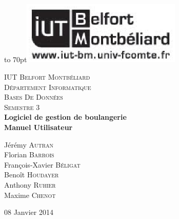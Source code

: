 \documentclass[12pt]{report}
\begin{document}
{
    \begin{titlepage}

    \vbox to 70pt{\hfill\includegraphics[height=3cm]{images/logo-iut.eps}}\
    \begin{center}

    \textsc{\LARGE IUT Belfort Montbéliard}\\[0.7cm]
    \textsc{\LARGE Département Informatique}\\[1.0cm]
    \textsc{\Large Bases De Données}\\[0.5cm]
    \textsc{\Large Semestre 3}\\[5cm]


    {\huge \bfseries Logiciel de gestion de boulangerie}\\[0.5cm]
    {\huge \bfseries Manuel Utilisateur}\\[5cm]

    \begin{large}
    Jérémy \textsc{Autran}\\[0.3em]
    Florian \textsc{Barrois}\\[0.3em]
    François-Xavier \textsc{Béligat}\\[0.3em]
    Benoît \textsc{Houdayer}\\[0.3em]
    Anthony \textsc{Ruhier}\\[0.3em]
    Maxime \textsc{Chenot}\\[0.3em]

    \end{large}

    \vfill

    {\large 08 Janvier 2014}

    \end{center}
    \end{titlepage}
    }

    {\clearpage\mbox{}\thispagestyle{empty}\clearpage}
    \setcounter{page}{1}
    {\large{}}


    
    
    
    
    
    
    


    \tableofcontents

\end{document}
